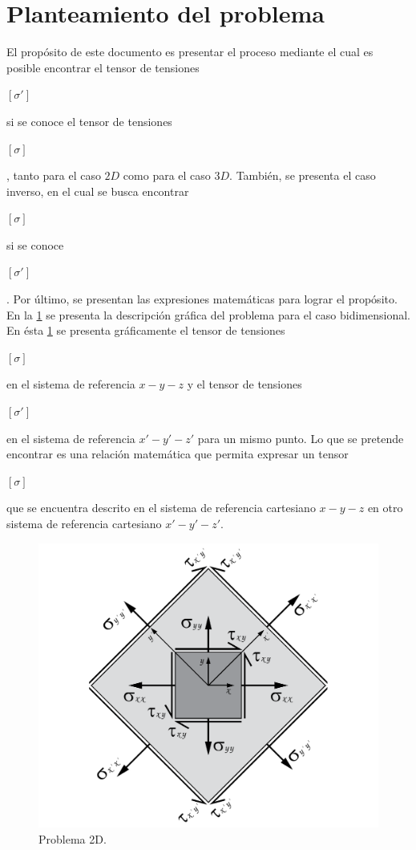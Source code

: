 \documentclass[12pt,letterpaper, twoside, openany]{article}
\begin{document}
\section{Planteamiento del problema}
%
El propósito de este documento es presentar el proceso mediante el cual es posible encontrar el tensor de tensiones \begin{large}$\left[ \sigma' \right]$\end{large} si se conoce el tensor de tensiones \begin{large}$\left[ \sigma \right]$\end{large}, tanto para el caso $2D$ como para el caso $3D$. También, se presenta el caso inverso, en el cual se busca encontrar \begin{large}$\left[ \sigma \right]$\end{large} si se conoce \begin{large}$\left[ \sigma' \right]$\end{large}. Por último, se presentan las expresiones matemáticas para lograr el propósito.
%
En la \cref{fig:planteamiento} se presenta la descripción gráfica del problema para el caso bidimensional. En ésta \cref{fig:planteamiento} se presenta gráficamente  el tensor de tensiones \begin{large}$\left[ \sigma \right]$\end{large} en el sistema de referencia $x-y-z$ y el tensor de tensiones \begin{large}$\left[ \sigma' \right]$\end{large} en el sistema de referencia $x'-y'-z'$ para un mismo punto. Lo que se pretende encontrar es una relación matemática que permita  expresar un tensor  \begin{large}$\left[ \sigma \right]$\end{large} que se encuentra descrito en el sistema de referencia cartesiano $x-y-z$ en otro sistema de referencia cartesiano $x'-y'-z'$. 
%
\begin{figure}[H]
	\centering
		\includegraphics[width=8 cm]{img/Planteamiento.pdf}
		\caption{Problema 2D.}
		\label{fig:planteamiento}
\end{figure}
%
\end{document}
